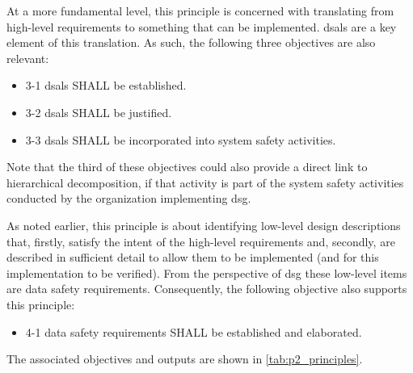At a more fundamental level, this principle is concerned with translating from high-level requirements to something that can be implemented. \Glspl{dsal} are a key element of this translation. As such, the following three objectives are also relevant:

\begin{itemize}
	\item \textcolor{dsiwgAccentColour}{3-1} \Glspl{dsal} SHALL be established.
	\item \textcolor{dsiwgAccentColour}{3-2} \Glspl{dsal} SHALL be justified.
	\item \textcolor{dsiwgAccentColour}{3-3} \Glspl{dsal} SHALL be incorporated into system safety activities.
\end{itemize}

Note that the third of these objectives could also provide a direct link to hierarchical decomposition, if that activity is part of the system safety activities conducted by the organization implementing \gls{dsg}.

As noted earlier, this principle is about identifying low-level design descriptions that, firstly, satisfy the intent of the high-level requirements and, secondly, are described in sufficient detail to allow them to be implemented (and for this implementation to be verified). From the perspective of \gls{dsg} these low-level items are \glspl{data safety requirement}. Consequently, the following objective also supports this principle:

\begin{itemize}
	\item \textcolor{dsiwgAccentColour}{4-1} \Glspl{data safety requirement} SHALL be established and elaborated.
\end{itemize}
\cbstart
The associated objectives and outputs are shown in \ref{tab:p2_principles}.

